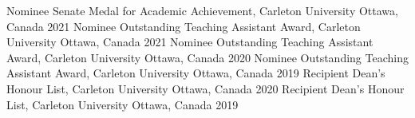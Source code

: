 



\begin{cvhonors}

  \cvhonor
    {Nominee} %
    {Senate Medal for Academic Achievement, Carleton University} %
    {Ottawa, Canada} %
    {2021} %
  \cvhonor
    {Nominee} %
    {Outstanding Teaching Assistant Award, Carleton University} %
    {Ottawa, Canada} %
    {2021} %
  \cvhonor
    {Nominee} %
    {Outstanding Teaching Assistant Award, Carleton University} %
    {Ottawa, Canada} %
    {2020} %
  \cvhonor
    {Nominee} %
    {Outstanding Teaching Assistant Award, Carleton University} %
    {Ottawa, Canada} %
    {2019} %
  \cvhonor
    {Recipient} %
    {Dean's Honour List, Carleton University} %
    {Ottawa, Canada} %
    {2020} %
  \cvhonor
    {Recipient} %
    {Dean's Honour List, Carleton University} %
    {Ottawa, Canada} %
    {2019} %

\end{cvhonors}



